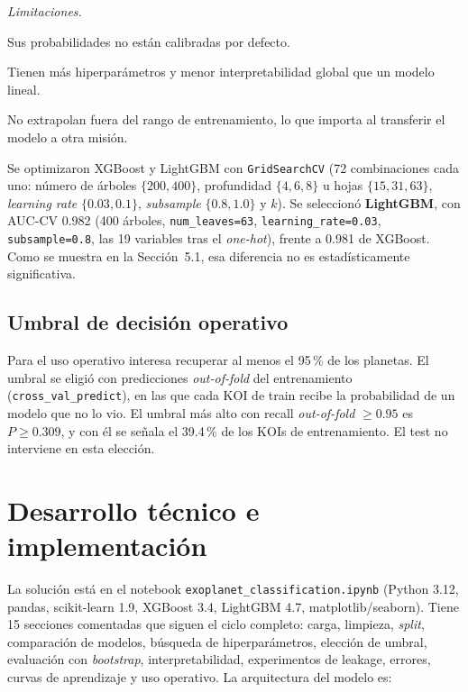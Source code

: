 \documentclass[11pt,a4paper]{article}
\begin{document}
\textit{Limitaciones.}
\begin{enumerate*}[label=(\roman*)]
\item Sus probabilidades no están calibradas por defecto.
\item Tienen más hiperparámetros y menor interpretabilidad global que un modelo lineal.
\item No extrapolan fuera del rango de entrenamiento, lo que importa al transferir el modelo a otra misión.
\end{enumerate*}

Se optimizaron XGBoost y LightGBM con \texttt{GridSearchCV} (72 combinaciones cada uno: número de árboles $\{200,400\}$, profundidad $\{4,6,8\}$ u hojas $\{15,31,63\}$, \textit{learning rate} $\{0.03,0.1\}$, \textit{subsample} $\{0.8,1.0\}$ y $k$). Se seleccionó \textbf{LightGBM}, con AUC-CV 0.982 (400 árboles, \texttt{num\_leaves=63}, \texttt{learning\_rate=0.03}, \texttt{subsample=0.8}, las 19 variables tras el \textit{one-hot}), frente a 0.981 de XGBoost. Como se muestra en la Sección~5.1, esa diferencia no es estadísticamente significativa.

\subsection{Umbral de decisión operativo}
Para el uso operativo interesa recuperar al menos el 95\,\% de los planetas. El umbral se eligió con predicciones \textit{out-of-fold} del entrenamiento (\texttt{cross\_val\_predict}), en las que cada KOI de train recibe la probabilidad de un modelo que no lo vio. El umbral más alto con recall \textit{out-of-fold} $\geq0.95$ es \textbf{$P\geq0.309$}, y con él se señala el 39.4\,\% de los KOIs de entrenamiento. El test no interviene en esta elección.

\section{Desarrollo técnico e implementación}
La solución está en el notebook \texttt{exoplanet\_classification.ipynb} (Python 3.12, pandas, scikit-learn 1.9, XGBoost 3.4, LightGBM 4.7, matplotlib/seaborn). Tiene 15 secciones comentadas que siguen el ciclo completo: carga, limpieza, \textit{split}, comparación de modelos, búsqueda de hiperparámetros, elección de umbral, evaluación con \textit{bootstrap}, interpretabilidad, experimentos de leakage, errores, curvas de aprendizaje y uso operativo. La arquitectura del modelo es:
\end{document}

